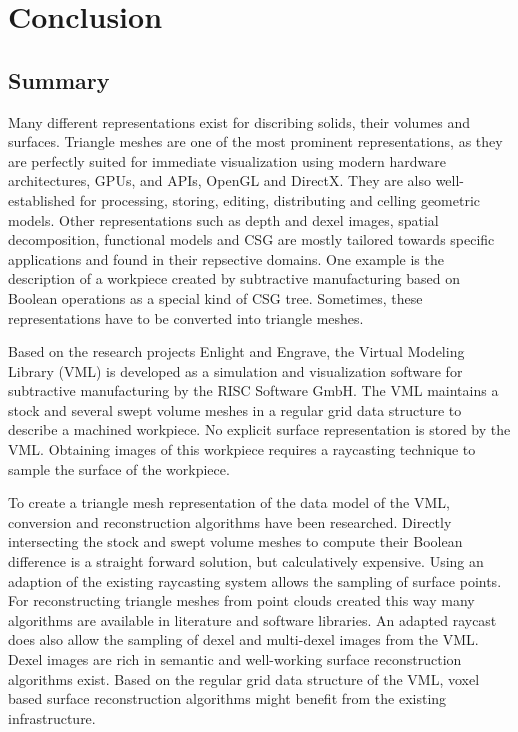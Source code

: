 \chapter{Conclusion}
\label{ch:conclusion}

\section{Summary}
\label{sec:summary}

Many different representations exist for discribing solids, their volumes and surfaces.
Triangle meshes are one of the most prominent representations, as they are perfectly suited for immediate visualization using modern hardware architectures, \ie GPUs, and APIs, \eg OpenGL and DirectX.
They are also well-established for processing, storing, editing, distributing and celling geometric models.
Other representations such as depth and dexel images, spatial decomposition, functional models and CSG are mostly tailored towards specific applications and found in their repsective domains.
One example is the description of a workpiece created by subtractive manufacturing based on Boolean operations as a special kind of CSG tree.
Sometimes, these representations have to be converted into triangle meshes.

Based on the research projects Enlight and Engrave, the Virtual Modeling Library (VML) is developed as a simulation and visualization software for subtractive manufacturing by the RISC Software GmbH.
The VML maintains a stock and several swept volume meshes in a regular grid data structure to describe a machined workpiece.
No explicit surface representation is stored by the VML.
Obtaining images of this workpiece requires a raycasting technique to sample the surface of the workpiece.

To create a triangle mesh representation of the data model of the VML, conversion and reconstruction algorithms have been researched.
%
Directly intersecting the stock and swept volume meshes to compute their Boolean difference is a straight forward solution, but calculatively expensive.
%
Using an adaption of the existing raycasting system allows the sampling of surface points.
For reconstructing triangle meshes from point clouds created this way many algorithms are available in literature and software libraries.
%
An adapted raycast does also allow the sampling of dexel and multi-dexel images from the VML.
Dexel images are rich in semantic and well-working surface reconstruction algorithms exist.
%
Based on the regular grid data structure of the VML, voxel based surface reconstruction algorithms might benefit from the existing infrastructure.

